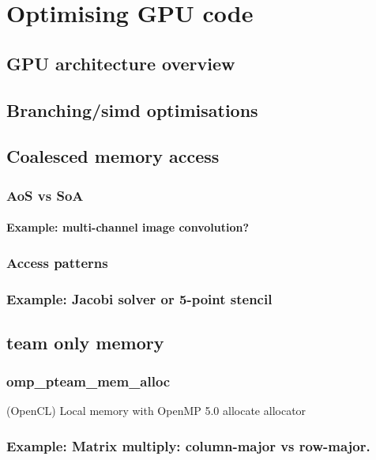 

\chapter{Optimising GPU code}

\section{GPU architecture overview}

\section{Branching/simd optimisations}

\section{Coalesced memory access}
\subsection{AoS vs SoA}
\subsubsection{Example: multi-channel image convolution?}

\subsection{Access patterns}
\subsection{Example: Jacobi solver or 5-point stencil}

\section{team only memory}
\subsection{omp\_pteam\_mem\_alloc}
(OpenCL) Local memory with OpenMP 5.0 allocate allocator
\subsection{Example: Matrix multiply: column-major vs row-major.}
